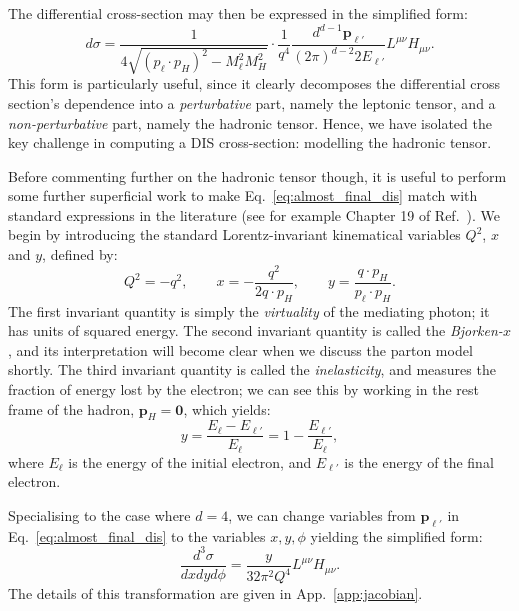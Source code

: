 \documentclass[withindex,glossary]{cam-thesis}
\renewcommand{\vec}[1]{\textbf{#1}} %
\begin{document}
The differential cross-section may then be expressed in the simplified form:
\begin{equation}
\label{eq:almost_final_dis}
d\sigma = \frac{1}{4\sqrt{(p_{\ell} \cdot p_H)^2 - M_{\ell}^2 M_H^2}} \cdot \frac{1}{q^4} \frac{d^{d-1}\vec{p}_{\ell'}}{(2\pi)^{d-2} 2E_{\ell'}} L^{\mu\nu} H_{\mu\nu}.
\end{equation}
This form is particularly useful, since it clearly decomposes the differential cross section's dependence into a \textit{perturbative} part, namely the leptonic tensor, and a \textit{non-perturbative} part, namely the hadronic tensor. Hence, we have isolated the key challenge in computing a DIS cross-section: modelling the hadronic tensor.

Before commenting further on the hadronic tensor though, it is useful to perform some further superficial work to make Eq.~\eqref{eq:almost_final_dis} match with standard expressions in the literature (see for example Chapter 19 of Ref.~\cite{ParticleDataGroup:2022pth}). We begin by introducing the standard Lorentz-invariant kinematical variables $Q^2$, $x$ and $y$, defined by:
\begin{equation}
\label{eq:dis_kinematics}
Q^2 = -q^2, \qquad x = -\frac{q^2}{2q \cdot p_H}, \qquad y = \frac{q \cdot p_H}{p_{\ell} \cdot p_H}.
\end{equation}
The first invariant quantity is simply the \textit{virtuality} of the mediating photon; it has units of squared energy. The second invariant quantity is called the \textit{Bjorken-$x$}, and its interpretation will become clear when we discuss the parton model shortly. The third invariant quantity is called the \textit{inelasticity}, and measures the fraction of energy lost by the electron; we can see this by working in the rest frame of the hadron, $\vec{p}_H = \vec{0}$, which yields:
\begin{equation}
y = \frac{E_{\ell} - E_{\ell'}}{E_{\ell}} = 1 - \frac{E_{\ell'}}{E_{\ell}},
\end{equation}
where $E_{\ell}$ is the energy of the initial electron, and $E_{\ell'}$ is the energy of the final electron.

Specialising to the case where $d=4$, we can change variables from $\vec{p}_{\ell'}$ in Eq.~\eqref{eq:almost_final_dis} to the variables $x,y,\phi$ yielding the simplified form:
\begin{equation}
\frac{d^3\sigma}{dx dy d\phi} = \frac{y}{32 \pi^2 Q^4} L^{\mu\nu} H_{\mu\nu}.
\end{equation}
The details of this transformation are given in App.~\ref{app:jacobian}.
\end{document}
